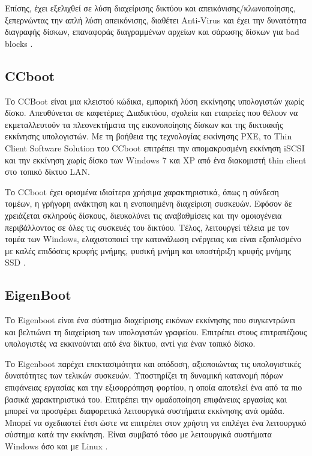 Επίσης, έχει εξελιχθεί σε λύση διαχείρισης δικτύου και απεικόνισης/κλωνοποίησης, ξεπερνώντας την απλή λύση απεικόνισης, διαθέτει Anti-Virus και έχει την δυνατότητα διαγραφής δίσκων, επαναφοράς διαγραμμένων αρχείων και σάρωσης δίσκων για bad blocks \cite{FOG_2020}.

\subsection{CCboot}
Το CCBoot είναι μια κλειστού κώδικα, εμπορική λύση εκκίνησης υπολογιστών χωρίς δίσκο. Aπευθύνεται σε καφετέριες Διαδικτύου, σχολεία και εταιρείες που θέλουν να εκμεταλλευτούν τα πλεονεκτήματα της εικονοποίησης δίσκων και της δικτυακής εκκίνησης υπολογιστών. Με τη βοήθεια της τεχνολογίας εκκίνησης PXE, το Thin Client Software Solution του CCboot επιτρέπει την απομακρυσμένη εκκίνηση iSCSI και την εκκίνηση χωρίς δίσκο των Windows 7 και XP από ένα διακομιστή thin client στο τοπικό δίκτυο LAN.

Το CCboot έχει ορισμένα ιδιαίτερα χρήσιμα χαρακτηριστικά, όπως η σύνδεση τομέων, η γρήγορη ανάκτηση και η ενοποιημένη διαχείριση συσκευών. Εφόσον δε χρειάζεται σκληρούς δίσκους, διευκολύνει τις αναβαθμίσεις και την ομοιογένεια περιβάλλοντος σε όλες τις συσκευές του δικτύου. Τέλος, λειτουργεί τέλεια με τον τομέα των Windows, ελαχιστοποιεί την κατανάλωση ενέργειας και είναι εξοπλισμένο με καλές επιδόσεις κρυφής μνήμης, φυσική μνήμη και υποστήριξη κρυφής μνήμης SSD \cite{CCboot_2022}.

\subsection{EigenBoot}
Το Eigenboot είναι ένα σύστημα διαχείρισης εικόνων εκκίνησης που συγκεντρώνει και βελτιώνει τη διαχείριση των υπολογιστών γραφείου. Επιτρέπει στους επιτραπέζιους υπολογιστές να εκκινούνται από ένα δίκτυο, αντί για έναν τοπικό δίσκο.

Το Eigenboot παρέχει επεκτασιμότητα και απόδοση, αξιοποιώντας τις υπολογιστικές δυνατότητες των τελικών συσκευών. Υποστηρίζει τη δυναμική κατανομή πόρων επιφάνειας εργασίας και την εξισορρόπηση φορτίου, η οποία αποτελεί ένα από τα πιο βασικά χαρακτηριστικά του. Επιτρέπει την ομαδοποίηση επιφάνειας εργασίας και μπορεί να προσφέρει διαφορετικά λειτουργικά συστήματα εκκίνησης ανά ομάδα. Μπορεί να σχεδιαστεί έτσι ώστε να επιτρέπει στον χρήστη να επιλέγει ένα λειτουργικό σύστημα κατά την εκκίνηση. Είναι συμβατό τόσο με λειτουργικά συστήματα Windows όσο και με Linux \cite{EigenBoot_2023}.

